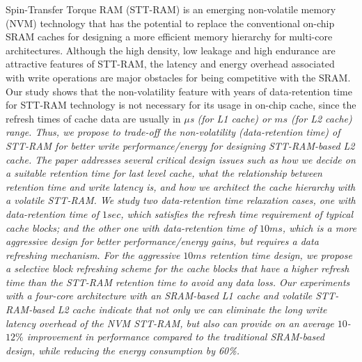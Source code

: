 
Spin-Transfer Torque RAM (STT-RAM) is an emerging non-volatile memory (NVM)
technology that has the potential to replace the conventional
on-chip SRAM caches for designing a more efficient memory hierarchy for
multi-core architectures. Although the high density, low leakage and high endurance are attractive features of STT-RAM,
the latency and energy overhead associated with write operations are major obstacles for being competitive with the SRAM.
Our study shows that the non-volatility feature with years of data-retention time for STT-RAM technology is not necessary for its usage in on-chip cache, since the refresh times of cache data are usually in  \it{$\mu$s} (for L1 cache) or $ms$ (for L2 cache) range. 
Thus,  we propose to trade-off the non-volatility (data-retention time) of STT-RAM
for better write performance/energy for designing STT-RAM-based L2 cache.
The paper addresses several critical design issues such as how we decide on a suitable retention time for last level cache,
what the relationship between retention time and write latency is,
and how we architect the cache hierarchy with a volatile STT-RAM.
We study two
data-retention time relaxation cases, one with data-retention time of  $1sec$, which satisfies the refresh time requirement of typical cache blocks; and the other one with data-retention time of $10ms$, which is a more aggressive design for better performance/energy gains, but requires a data refreshing mechanism.
For the aggressive $10ms$ retention time design, we propose a selective block refreshing scheme for the
cache blocks that have a higher refresh time than the STT-RAM retention time to avoid any data loss.
Our experiments with a four-core architecture with an SRAM-based L1 cache and volatile STT-RAM-based L2 cache
indicate that not only we can eliminate the long write latency overhead of the NVM STT-RAM, but also can provide
on an average $10$-$12\%$ improvement in performance compared to the traditional SRAM-based
design, while reducing the energy consumption by 60\%.

